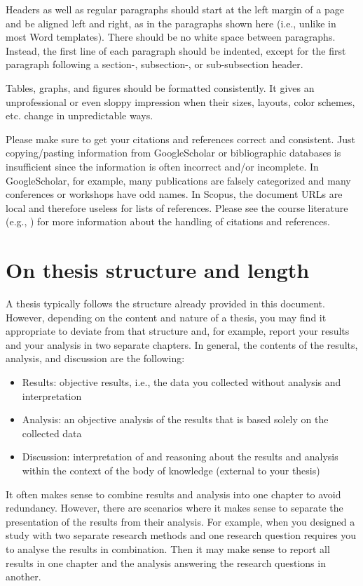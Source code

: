\documentclass[a4paper,twoside]{bth}
\begin{document}
Headers as well as regular paragraphs should start at the left margin of a page and be aligned left and right, as in the paragraphs shown here (i.e., unlike in most Word templates).
There should be no white space between paragraphs. Instead, the first line of each paragraph should be indented, except for the first paragraph following a section-, subsection-, or sub-subsection header.

Tables, graphs, and figures should be formatted consistently. It gives an unprofessional or even sloppy impression when their sizes, layouts, color schemes, etc. change in unpredictable ways. 

Please make sure to get your citations and references correct and consistent.
Just copying/pasting information from GoogleScholar or bibliographic databases is insufficient since the information is often incorrect and/or incomplete. In GoogleScholar, for example, many publications are falsely categorized and many conferences or workshops have odd names. In Scopus, the document URLs are local and therefore useless for lists of references.
Please see the course literature (e.g., \cite{berndtsson2007thesis,evans2014write,glasman2021science,zobel2014writing}) for more information about the handling of citations and references.


\section{On thesis structure and length}
\label{sec:theis-structure}
A thesis typically follows the structure already provided in this document. However, depending on the content and nature of a thesis, you may find it appropriate to deviate from that structure and, for example, report your results and your analysis in two separate chapters. In general, the contents of the results, analysis, and discussion are the following:
\begin{itemize}
    \item Results: objective results, i.e., the data you collected without analysis and interpretation
    \item Analysis: an objective analysis of the results that is based solely on the collected data
    \item Discussion: interpretation of and reasoning about the results and analysis within the context of the body of knowledge (external to your thesis)
\end{itemize}

It often makes sense to combine results and analysis into one chapter to avoid redundancy. However, there are scenarios where it makes sense to separate the presentation of the results from their analysis. For example, when you designed a study with two separate research methods and one research question requires you to analyse the results in combination. Then it may make sense to report all results in one chapter and the analysis answering the research questions in another. 
\end{document}
